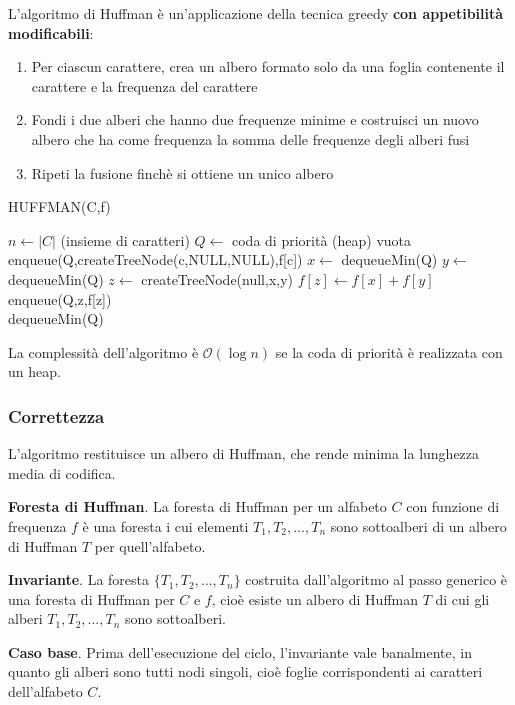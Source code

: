 \documentclass[11pt]{article}
\begin{document}
L'algoritmo di Huffman è un'applicazione della tecnica greedy \textbf{con appetibilità modificabili}:
\begin{enumerate}
    \item Per ciascun carattere, crea un albero formato solo da una foglia contenente il carattere e la frequenza del carattere 
    \item Fondi i due alberi che hanno due frequenze minime e costruisci un nuovo albero che ha come frequenza la somma 
    delle frequenze degli alberi fusi 
    \item Ripeti la fusione finchè si ottiene un unico albero 
\end{enumerate}
\begin{algorithm}
    \caption{HUFFMAN(C,f)}
    \begin{algorithmic}
        \State $n\gets |C|$ (insieme di caratteri)
        \State $Q\gets$ coda di priorità (heap) vuota
            \State enqueue(Q,createTreeNode(c,NULL,NULL),f[c])
        \EndFor 
            \State $x\gets$ dequeueMin(Q)
            \State $y \gets$ dequeueMin(Q)
            \State $z \gets$ createTreeNode(null,x,y)
            \State $f[z] \gets f[x]+f[y]$
            \State enqueue(Q,z,f[z])
        \EndFor\\
        \Return dequeueMin(Q)
    \end{algorithmic}
\end{algorithm}
La complessità dell'algoritmo è $\mathcal{O}(\log n)$ se la coda di priorità è realizzata con un heap.
\subsubsection{Correttezza}
L'algoritmo restituisce un albero di Huffman, che rende minima la lunghezza media di codifica.

\textbf{Foresta di Huffman}. La foresta di Huffman per un alfabeto $C$ con funzione di frequenza $f$ è una foresta i 
cui elementi $T_1,T_2,\dots,T_n$ sono sottoalberi di un albero di Huffman $T$ per quell'alfabeto.

\textbf{Invariante}. La foresta $\{T_1,T_2,\dots,T_n\}$ costruita dall'algoritmo al passo generico è una foresta di 
Huffman per $C$ e $f$, cioè esiste un albero di Huffman $T$ di cui gli alberi $T_1,T_2,\dots,T_n$ sono sottoalberi.

\textbf{Caso base}. Prima dell'esecuzione del ciclo, l'invariante vale banalmente, in quanto gli alberi sono tutti 
nodi singoli, cioè foglie corrispondenti ai caratteri dell'alfabeto $C$.
\end{document}
